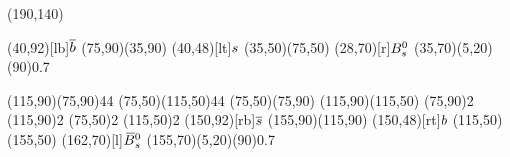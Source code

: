 \documentclass{standalone}
\begin{document}
\begin{axopicture}(190,140)

  \Text(40,92)[lb]{${\overline {{b}}}$}    %
  \Line[arrow](75,90)(35,90)        %
  \Text(40,48)[lt]{${s}$}       %
  \Line[arrow](35,50)(75,50)        %
  \Text(28,70)[r]{${{B}^0_{s}}$}            %
  \GOval(35,70)(5,20)(90){0.7}      %
                                    
  \Photon(115,90)(75,90){4}{4}      %
  \Photon(75,50)(115,50){4}{4}      %
  \Line[arrow](75,50)(75,90)        %
  \Line[arrow](115,90)(115,50)      %
  \Vertex(75,90){2}                 %
  \Vertex(115,90){2}                %
  \Vertex(75,50){2}                 %
  \Vertex(115,50){2}                %
  \Text(150,92)[rb]{${\overline {{s}}}$}   %
  \Line[arrow](155,90)(115,90)      %
  \Text(150,48)[rt]{${b}$}      %
  \Line[arrow](115,50)(155,50)      %
  \Text(162,70)[l]{${{\kern 0.18em\overline{\kern -0.18em B}}{}^0_{s}}$}          %
  \GOval(155,70)(5,20)(90){0.7}     %
                                    
\end{axopicture}
\end{document}

